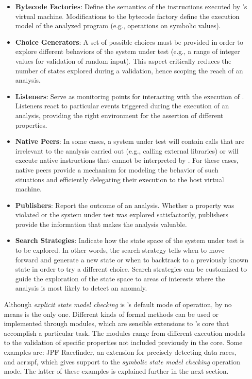 \begin{itemize}
	\item \textbf{Bytecode Factories}: Define the semantics of the instructions executed by \jpf{}'s virtual machine. Modifications to the bytecode factory define the execution model of the analyzed program (e.g., operations on symbolic values).
	
	\item \textbf{Choice Generators}: A set of possible choices must be provided in order to explore different behaviors of the system under test (e.g., a range of integer values for validation of random input). This aspect critically reduces the number of states explored during a validation, hence scoping the reach of an analysis.
	
	\item \textbf{Listeners}: Serve as monitoring points for interacting with the execution of \jpf{}. Listeners react to particular events triggered during the execution of an analysis, providing the right environment for the assertion of different properties.
	
	\item \textbf{Native Peers}: In some cases, a system under test will contain calls that are irrelevant to the analysis carried out (e.g., calling external libraries) or will execute native instructions that cannot be interpreted by \jpf{}. For these cases, native peers provide a mechanism for modeling the behavior of such situations and efficiently delegating their execution to the host virtual machine.
	
	\item \textbf{Publishers}: Report the outcome of an analysis. Whether a property was violated or the system under test was explored satisfactorily, publishers provide the information that makes the analysis valuable.   
	
	\item \textbf{Search Strategies}: Indicate how the state space of the system under test is to be explored. In other words, the search strategy tells \jpf{} when to move forward and generate a new state or when to backtrack to a previously known state in order to try a different choice. Search strategies can be customized to guide the exploration of the state space to areas of interests where the analysis is most likely to detect an anomaly. 
\end{itemize}

Although \textit{explicit state model checking} is \jpf{}'s default mode of operation, by no means is the only one. Different kinds of formal methods can be used or implemented through modules, which are sensible extensions to \jpf{}'s core that accomplish a particular task. The modules range from different execution models to the validation of specific properties not included previously in the core. Some examples are: JPF-Racefinder, an extension for precisely detecting data races, and \acrfull{acr:spf}, which gives support to the \textit{symbolic state model checking} operation mode. The latter of these examples is explained further in the next section.

